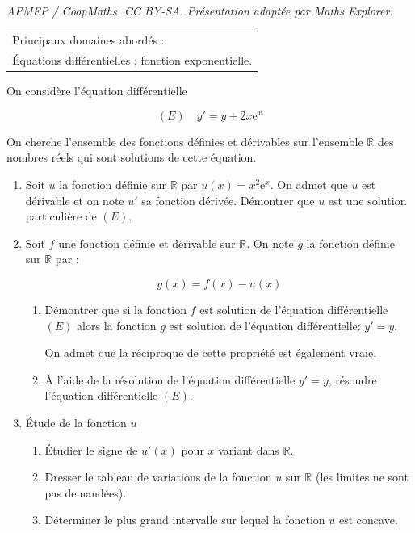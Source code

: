 \documentclass[10pt]{article}
\providecommand{\R}{\mathbb{R}}
\providecommand{\e}{{\mathrm{e}}}
\begin{document}
\noindent\textit{APMEP / CoopMaths. CC BY-SA. Présentation adaptée par Maths Explorer.}\par\medskip
\vspace{0.5cm}

\begin{tabular}[]{|l|}
\hline
Principaux domaines abordés :\\
Équations différentielles ; fonction exponentielle.\\
\hline
\end{tabular}

\bigskip

On considère l’équation différentielle 

\[(E)\quad  y'= y + 2x\e^x\]
 
On cherche l'ensemble des fonctions définies et dérivables sur l'ensemble $\R$ des nombres réels qui sont solutions de cette équation. 

\begin{enumerate}
\item  Soit $u$ la fonction définie sur $\R$ par $u(x) = x^2\e^x$. On admet que $u$ est dérivable et on note $u'$ sa fonction dérivée. Démontrer que $u$ est une solution particulière de $(E)$. 

\item Soit $f$ une fonction définie et dérivable sur $\R$. On note $g$ la fonction définie sur $\R$ par : 

\[g(x) = f(x) - u(x)\]

	\begin{enumerate}
		\item  Démontrer que si la fonction $f$ est solution de l'équation différentielle $(E)$ alors la fonction $g$ est solution de l'équation différentielle: $y' =y$. 

On admet que la réciproque de cette propriété est également vraie. 
		\item À l'aide de la résolution de l'équation différentielle $y' =y$, résoudre l'équation différentielle $(E)$. 
	\end{enumerate}
\item Étude de la fonction $u $
	\begin{enumerate}
		\item  Étudier le signe de $u' (x)$ pour $x$ variant dans $\R$. 
		\item Dresser le tableau de variations de la fonction $u$ sur $\R$ (les limites ne sont pas demandées). 
		\item Déterminer le plus grand intervalle sur lequel la fonction $u$ est concave. 
\end{enumerate}
\end{enumerate}
\end{document}
